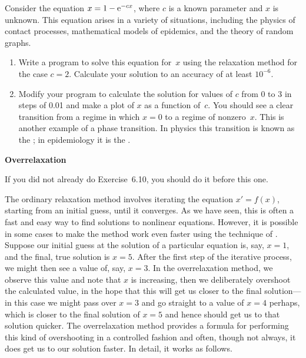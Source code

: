 \documentclass[12pt]{article}
\begin{document}
\begin{exercises}
\exercise Consider the equation $x = 1 - \mathrm{e}^{-cx}$, where $c$ is a known
parameter and $x$ is unknown.  This equation arises in a variety of
situations, including the physics of contact processes, mathematical models
of epidemics, and the theory of random graphs.
\begin{enumerate}\setlength{\itemsep}{0pt}
\item Write a program to solve this equation for~$x$ using the relaxation
  method for the case $c=2$.  Calculate your solution to an accuracy of at
  least $10^{-6}$.
\item Modify your program to calculate the solution for values of $c$ from
  0 to 3 in steps of 0.01 and make a plot of $x$ as a function of~$c$.  You
  should see a clear transition from a regime in which $x=0$ to a regime of
  nonzero~$x$.  This is another example of a phase transition.  In physics
  this transition is known as the ; in
  epidemiology it is the .
\end{enumerate}



\exercise \textbf{Overrelaxation}

\exskip If you did not already do Exercise~6.10, you should do it before
this one.

The ordinary relaxation method involves iterating the equation $x' = f(x)$,
starting from an initial guess, until it converges.  As we have seen, this
is often a fast and easy way to find solutions to nonlinear equations.
However, it is possible in some cases to make the method work even faster
using the technique of .  Suppose our initial guess at
the solution of a particular equation is, say, $x=1$, and the final, true
solution is $x=5$.  After the first step of the iterative process, we might
then see a value of, say, $x=3$.  In the overrelaxation method, we observe
this value and note that $x$ is increasing, then we deliberately overshoot
the calculated value, in the hope that this will get us closer to the final
solution---in this case we might pass over $x=3$ and go straight to a value
of $x=4$ perhaps, which is closer to the final solution of $x=5$ and hence
should get us to that solution quicker.  The overrelaxation method
provides a formula for performing this kind of overshooting in a controlled
fashion and often, though not always, it does get us to our solution
faster.  In detail, it works as follows.


\end{exercises}
\end{document}
